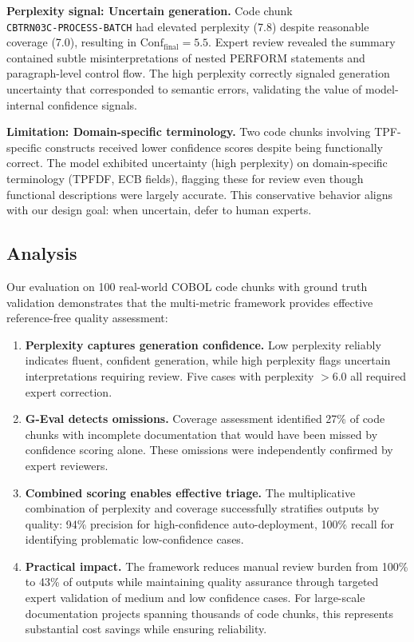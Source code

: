 \textbf{Perplexity signal: Uncertain generation.} Code chunk \\\texttt{CBTRN03C-PROCESS-BATCH} had elevated perplexity (7.8) despite reasonable coverage (7.0), resulting in $\text{Conf}_{\text{final}} = 5.5$. Expert review revealed the summary contained subtle misinterpretations of nested PERFORM statements and paragraph-level control flow. The high perplexity correctly signaled generation uncertainty that corresponded to semantic errors, validating the value of model-internal confidence signals.

\textbf{Limitation: Domain-specific terminology.} Two code chunks involving TPF-specific constructs received lower confidence scores despite being functionally correct. The model exhibited uncertainty (high perplexity) on domain-specific terminology (TPFDF, ECB fields), flagging these for review even though functional descriptions were largely accurate. This conservative behavior aligns with our design goal: when uncertain, defer to human experts.

\subsection{Analysis}

Our evaluation on 100 real-world COBOL code chunks with ground truth validation demonstrates that the multi-metric framework provides effective reference-free quality assessment:

\begin{enumerate}
    \item \textbf{Perplexity captures generation confidence.} Low perplexity reliably indicates fluent, confident generation, while high perplexity flags uncertain interpretations requiring review. Five cases with perplexity $> 6.0$ all required expert correction.
    
    \item \textbf{G-Eval detects omissions.} Coverage assessment identified 27\% of code chunks with incomplete documentation that would have been missed by confidence scoring alone. These omissions were independently confirmed by expert reviewers.
    
    \item \textbf{Combined scoring enables effective triage.} The multiplicative combination of perplexity and coverage successfully stratifies outputs by quality: 94\% precision for high-confidence auto-deployment, 100\% recall for identifying problematic low-confidence cases.
    
    \item \textbf{Practical impact.} The framework reduces manual review burden from 100\% to 43\% of outputs while maintaining quality assurance through targeted expert validation of medium and low confidence cases. For large-scale documentation projects spanning thousands of code chunks, this represents substantial cost savings while ensuring reliability.
\end{enumerate}

